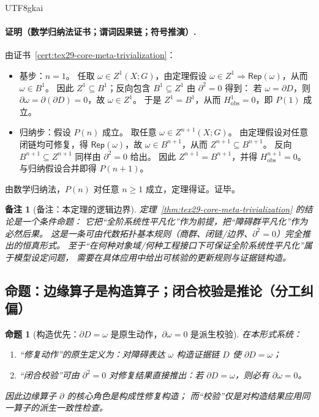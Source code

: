 \documentclass[12pt]{article}
\newtheorem{proposition}{命题}[section]
\newtheorem{remark}{备注}[section]
\newcommand{\KouJing}{\texorpdfstring{表述约定}{表述约定}}
\begin{document}
\begin{CJK*}{UTF8}{gkai}
\paragraph{证明（数学归纳法证书；谓词因果链；符号推演）.}
由证书~\ref{cert:tex29-core-meta-trivialization}：
\begin{itemize}
  \item 基步：$n=1$。
  任取 $\omega\in Z^1(X;G)$，由定理假设 $\omega\in Z^1\Rightarrow \mathsf{Rep}(\omega)$，从而 $\omega\in B^1$。
  因此 $Z^1\subseteq B^1$；反向包含 $B^1\subseteq Z^1$ 由 $\partial^2=0$ 得到：
  若 $\omega=\partial D$，则 $\partial\omega=\partial(\partial D)=0$，故 $\omega\in Z^1$。
  于是 $Z^1=B^1$，从而 $H^1_{\mathrm{obs}}=0$，即 $P(1)$ 成立。
  \item 归纳步：假设 $P(n)$ 成立。
  取任意 $\omega\in Z^{n+1}(X;G)$。
  由定理假设对任意闭链均可修复，得 $\mathsf{Rep}(\omega)$，故 $\omega\in B^{n+1}$，从而 $Z^{n+1}\subseteq B^{n+1}$。
  反向 $B^{n+1}\subseteq Z^{n+1}$ 同样由 $\partial^2=0$ 给出。
  因此 $Z^{n+1}=B^{n+1}$，并得 $H^{n+1}_{\mathrm{obs}}=0$。
  与归纳假设合并即得 $P(n+1)$。
\end{itemize}
由数学归纳法，$P(n)$ 对任意 $n\ge 1$ 成立，定理得证。证毕。

\begin{remark}[备注：本定理的逻辑边界]
定理~\ref{thm:tex29-core-meta-trivialization} 的结论是一个\emph{条件命题}：
它把“全阶系统性平凡化”作为前提，把“障碍群平凡化”作为必然后果。
这是一条可由代数拓扑基本规则（商群、闭链/边界、$\partial^2=0$）完全推出的恒真形式。
至于“在何种对象域/何种工程接口下可保证全阶系统性平凡化”属于模型设定问题，
需要在具体应用中给出可核验的更新规则与证据链构造。
\end{remark}

\subsection{命题：边缘算子是构造算子；闭合校验是推论（分工纠偏）}
\label{subsec:tex29-core-meta-edge-operator-positioning}

\begin{proposition}[构造优先：$\partial D=\omega$ 是原生动作，$\partial\omega=0$ 是派生校验]
\label{prop:tex29-core-meta-edge-operator-positioning}
在本形式系统：
\begin{enumerate}
  \item “修复动作”的原生定义为：对障碍表达 $\omega$ 构造证据链 $D$ 使 $\partial D=\omega$；
  \item “闭合校验”可由 $\partial^2=0$ 对修复结果直接推出：若 $\partial D=\omega$，则必有 $\partial\omega=0$。
\end{enumerate}
因此边缘算子 $\partial$ 的核心角色是\emph{构成性修复构造}；
而“校验”仅是对构造结果应用同一算子的派生一致性检查。
\end{proposition}


\end{CJK*}
\end{document}
